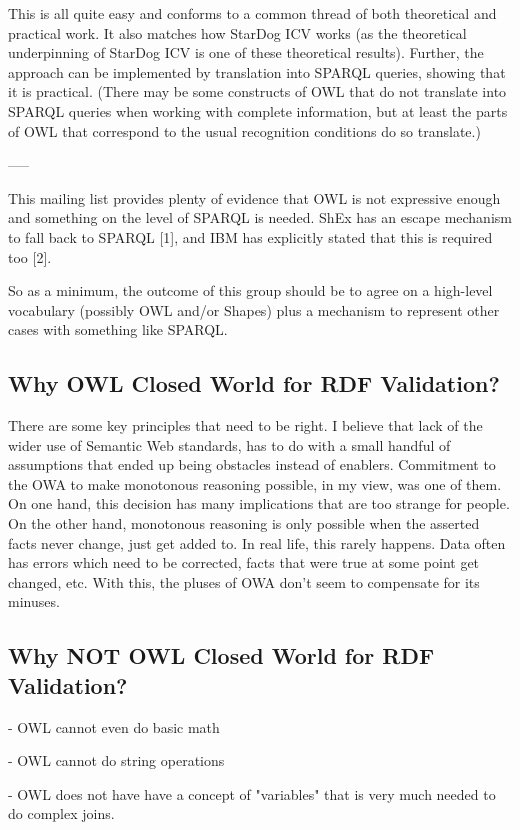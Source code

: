 \documentclass{llncs}
\begin{document}
This is all quite easy and conforms to a common thread of both theoretical
and practical work.  It also matches how StarDog ICV works (as the
theoretical underpinning of StarDog ICV is one of these theoretical
results).  Further, the approach can be implemented by translation into
SPARQL queries, showing that it is practical.  (There may be some constructs
of OWL that do not translate into SPARQL queries when working with complete
information, but at least the parts of OWL that correspond to the usual
recognition conditions do so translate.)

-----

This mailing list provides plenty of evidence that OWL is not expressive 
enough and something on the level of SPARQL is needed. ShEx has an 
escape mechanism to fall back to SPARQL [1], and IBM has explicitly 
stated that this is required too [2]. 

So as a minimum, the outcome of 
this group should be to agree on a high-level vocabulary (possibly OWL 
and/or Shapes) plus a mechanism to represent other cases with something 
like SPARQL. 

\subsection{Why OWL Closed World for RDF Validation?}

There are some key principles that need to be right. I believe that lack of the wider use of Semantic Web standards, has to do with a small handful of assumptions that ended up being obstacles instead of enablers. Commitment to the OWA to make monotonous reasoning possible, in my view, was one of them. On one hand, this decision has many implications that are too strange for people. On the other hand, monotonous reasoning is only possible when the asserted facts never change, just get added to. In real life, this rarely happens. Data often has errors which need to be corrected, facts that were true at some point get changed, etc. With this, the pluses of OWA don't seem to compensate for its minuses.

\subsection{Why NOT OWL Closed World for RDF Validation?}

- OWL cannot even do basic math 

- OWL cannot do string operations

- OWL does not have have a concept of "variables" that is very much needed to do complex joins. 
\end{document}
